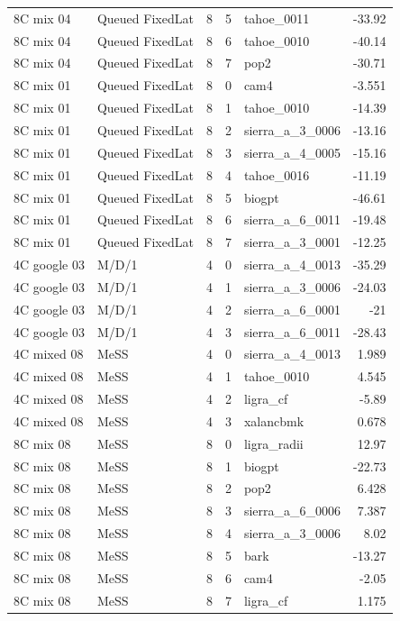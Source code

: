 \begin{tabular}{llrrlr}
8C mix 04 & Queued FixedLat & 8 & 5 & tahoe\_0011 & -33.92 \\
8C mix 04 & Queued FixedLat & 8 & 6 & tahoe\_0010 & -40.14 \\
8C mix 04 & Queued FixedLat & 8 & 7 & pop2 & -30.71 \\
8C mix 01 & Queued FixedLat & 8 & 0 & cam4 & -3.551 \\
8C mix 01 & Queued FixedLat & 8 & 1 & tahoe\_0010 & -14.39 \\
8C mix 01 & Queued FixedLat & 8 & 2 & sierra\_a\_3\_0006 & -13.16 \\
8C mix 01 & Queued FixedLat & 8 & 3 & sierra\_a\_4\_0005 & -15.16 \\
8C mix 01 & Queued FixedLat & 8 & 4 & tahoe\_0016 & -11.19 \\
8C mix 01 & Queued FixedLat & 8 & 5 & biogpt & -46.61 \\
8C mix 01 & Queued FixedLat & 8 & 6 & sierra\_a\_6\_0011 & -19.48 \\
8C mix 01 & Queued FixedLat & 8 & 7 & sierra\_a\_3\_0001 & -12.25 \\
4C google 03 & M/D/1 & 4 & 0 & sierra\_a\_4\_0013 & -35.29 \\
4C google 03 & M/D/1 & 4 & 1 & sierra\_a\_3\_0006 & -24.03 \\
4C google 03 & M/D/1 & 4 & 2 & sierra\_a\_6\_0001 & -21 \\
4C google 03 & M/D/1 & 4 & 3 & sierra\_a\_6\_0011 & -28.43 \\
4C mixed 08 & MeSS & 4 & 0 & sierra\_a\_4\_0013 & 1.989 \\
4C mixed 08 & MeSS & 4 & 1 & tahoe\_0010 & 4.545 \\
4C mixed 08 & MeSS & 4 & 2 & ligra\_cf & -5.89 \\
4C mixed 08 & MeSS & 4 & 3 & xalancbmk & 0.678 \\
8C mix 08 & MeSS & 8 & 0 & ligra\_radii & 12.97 \\
8C mix 08 & MeSS & 8 & 1 & biogpt & -22.73 \\
8C mix 08 & MeSS & 8 & 2 & pop2 & 6.428 \\
8C mix 08 & MeSS & 8 & 3 & sierra\_a\_6\_0006 & 7.387 \\
8C mix 08 & MeSS & 8 & 4 & sierra\_a\_3\_0006 & 8.02 \\
8C mix 08 & MeSS & 8 & 5 & bark & -13.27 \\
8C mix 08 & MeSS & 8 & 6 & cam4 & -2.05 \\
8C mix 08 & MeSS & 8 & 7 & ligra\_cf & 1.175 \\

\end{tabular}
